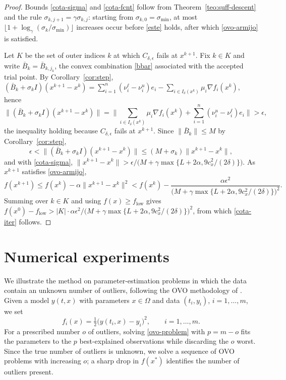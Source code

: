 \documentclass[11pt]{article}
\newcommand{\flow}{f_{\mathrm{low}}}
\begin{document}
\begin{proof}
Bounds \eqref{cota-sigma} and \eqref{cota-fcnt} follow from
Theorem~\ref{teo:suff-descent} and the rule
$\sigma_{k,j+1} = \gamma\sigma_{k,j}$: starting from
$\sigma_{k,0} = \sigma_{\min}$, at most
$\lfloor 1 + \log_\gamma(\sigma_k/\sigma_{\min}) \rfloor$ increases occur before
\eqref{este} holds, after which \eqref{ovo-armijo} is satisfied.

Let $K$ be the set of outer indices $k$ at which $C_{\delta,\epsilon}$ fails at
$x^{k+1}$. Fix $k \in K$ and write $\bar{B}_k = \bar{B}_{k,j_k}$, the convex
combination \eqref{bbar} associated with the accepted trial point. By
Corollary~\ref{cor:step},
$(\bar{B}_k + \sigma_k I)(x^{k+1} - x^k)
= \sum_{i=1}^n (\nu^\ell_i - \nu^u_i) e_i
- \sum_{i \in I_\delta(x^k)} \mu_i \nabla f_i(x^k)$, hence
\[
\big\| (\bar{B}_k + \sigma_k I)(x^{k+1} - x^k) \big\|
= \Big\| \sum_{i \in I_\delta(x^k)} \mu_i \nabla f_i(x^k)
+ \sum_{i=1}^n (\nu^u_i - \nu^\ell_i) e_i \Big\| > \epsilon,
\]
the inequality holding because $C_{\delta,\epsilon}$ fails at $x^{k+1}$. Since
$\|\bar{B}_k\| \leq M$ by Corollary~\ref{cor:step},
\[
\epsilon < \| (\bar{B}_k + \sigma_k I)(x^{k+1} - x^k) \|
\leq (M + \sigma_k) \|x^{k+1} - x^k\|,
\]
and with \eqref{cota-sigma},
$\|x^{k+1} - x^k\| > \epsilon / \big( M + \gamma\max\{L + 2\alpha, 9c_x^2/(2\delta)\} \big)$.
As $x^{k+1}$ satisfies \eqref{ovo-armijo},
\[
f(x^{k+1}) \leq f(x^k) - \alpha\|x^{k+1} - x^k\|^2
< f(x^k) - \frac{\alpha\epsilon^2}
{\big( M + \gamma\max\{L + 2\alpha, 9c_x^2/(2\delta)\} \big)^2}.
\]
Summing over $k \in K$ and using $f(x) \geq \flow$ gives
$f(x^0) - \flow > |K| \cdot \alpha\epsilon^2 /
\big( M + \gamma\max\{L + 2\alpha, 9c_x^2/(2\delta)\} \big)^2$, from which
\eqref{cota-iter} follows.
\end{proof}

\section{Numerical experiments} \label{sec:numerical}

We illustrate the method on parameter-estimation problems in which the data
contain an unknown number of outliers, following the OVO methodology of
\cite{alvarezovo}. Given a model $y(t,x)$ with parameters $x\in\Omega$ and data
$(t_i,y_i)$, $i=1,\dots,m$, we set
\[
f_i(x)=\tfrac12\big(y(t_i,x)-y_i\big)^2,\qquad i=1,\dots,m.
\]
For a prescribed number $o$ of outliers, solving \eqref{ovo-problem} with
$p=m-o$ fits the parameters to the $p$ best-explained observations while
discarding the $o$ worst. Since the true number of outliers is unknown, we
solve a sequence of OVO problems with increasing $o$; a sharp drop in $f(x^*)$
identifies the number of outliers present.
\end{document}
